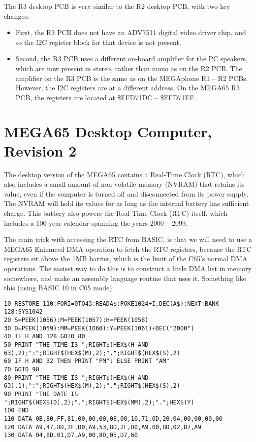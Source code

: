 The R3 desktop PCB is very similar to the R2 desktop PCB, with two key changes:

\begin{itemize}
\item First, the R3 PCB does not have an ADV7511 digital video driver chip, and so the I2C register block for that device is not present.
\item Second, the R3 PCB uses a different on-board amplifier for the PC speakers, which are now present in stereo, rather than mono
  as on the R2 PCB.  The amplifier on the R3 PCB is the same as on the MEGAphone R1 -- R2 PCBs.
  However, the I2C registers are at a different address.  On the MEGA65 R3 PCB, the registers are located at \$FFD71DC -- \$FFD71EF.
\end{itemize}



\section{MEGA65 Desktop Computer, Revision 2}

The desktop version of the MEGA65 contains a Real-Time Clock (RTC), which also includes a small amount of non-volatile memory (NVRAM)
that retains its value, even if the computer is turned off and disconnected from its power supply. The NVRAM will hold its values
for as long as the internal battery has sufficient charge.  This battery also powers the Real-Time Clock (RTC) itself, which includes
a 100 year calendar spanning the years 2000 -- 2099.

The main trick with accessing the RTC from BASIC, is that we will need to use a MEGA65 Enhanced DMA operation to fetch the RTC registers, because the RTC registers sit above the 1MB barrier, which is the limit of the C65's normal DMA operations.  The easiest way to do this is to construct a little DMA list in memory somewhere, and make an assembly language routine that uses it.  Something like this (using BASIC 10 in C65 mode):

\begin{tcolorbox}[colback=black,coltext=white]
\verbatimfont{\codefont}
\begin{verbatim}
10 RESTORE 110:FORI=0TO43:READA$:POKE1024+I,DEC(A$):NEXT:BANK 128:SYS1042
20 S=PEEK(1056):M=PEEK(1057):H=PEEK(1058)
30 D=PEEK(1059):MM=PEEK(1060):Y=PEEK(1061)+DEC("2000")
40 IF H AND 128 GOTO 80
50 PRINT "THE TIME IS ";RIGHT$(HEX$(H AND 63),2);":";RIGHT$(HEX$(M),2);".";RIGHT$(HEX$(S),2)
60 IF H AND 32 THEN PRINT "PM": ELSE PRINT "AM"
70 GOTO 90
80 PRINT "THE TIME IS ";RIGHT$(HEX$(H AND 63),1);":";RIGHT$(HEX$(M),2);".";RIGHT$(HEX$(S),2)
90 PRINT "THE DATE IS ";RIGHT$(HEX$(D),2);".";RIGHT$(HEX$(MM),2);".";HEX$(Y)
100 END
110 DATA 0B,80,FF,81,00,00,00,08,00,10,71,0D,20,04,00,00,00,00
120 DATA A9,47,8D,2F,D0,A9,53,8D,2F,D0,A9,00,8D,02,D7,A9
130 DATA 04,8D,01,D7,A9,00,8D,05,D7,60
\end{verbatim}
\end{tcolorbox}


